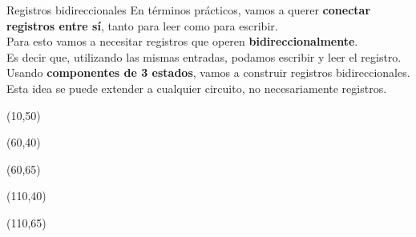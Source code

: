 \documentclass[aspectratio=169]{beamer}
\begin{document}
\begin{frame}[t]{Registros bidireccionales}
    \small En términos prácticos, vamos a querer \textbf{conectar registros entre sí}, tanto para leer como para escribir.\\
    \vspace{0.2cm}
    Para esto vamos a necesitar registros que operen \textbf{bidireccionalmente}.\\ Es decir que, utilizando las mismas entradas, podamos escribir y leer el registro.\\
    \vspace{0.2cm}
    Usando \textbf{componentes de 3 estados}, vamos a construir registros bidireccionales.\\
    Esta idea se puede extender a cualquier circuito, no necesariamente registros.\\
    \vspace{0.4cm}
    \begin{textblock}{65}(10,50)  \end{textblock}
    \begin{textblock}{65}(60,40)  \end{textblock}
    \begin{textblock}{65}(60,65)  \end{textblock}
    \begin{textblock}{35}(110,40)
     \end{textblock}
    \begin{textblock}{35}(110,65)
     \end{textblock}
\end{frame}
\end{document}
